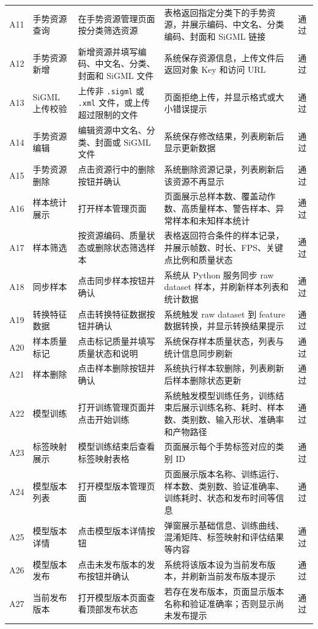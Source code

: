 \begin{longtable}{L{0.08\textwidth} L{0.18\textwidth} L{0.24\textwidth} L{0.28\textwidth} L{0.12\textwidth}}
  A11 & 手势资源查询 & 在手势资源管理页面按分类筛选资源 & 表格返回指定分类下的手势资源，并展示编码、中文名、分类编码、封面和 SiGML 链接 & 通过 \\
  A12 & 手势资源新增 & 新增资源并填写编码、中文名、分类、封面和 SiGML 文件 & 系统保存资源信息，上传文件后返回对象 Key 和访问 URL & 通过 \\
  A13 & SiGML 上传校验 & 上传非 \texttt{.sigml} 或 \texttt{.xml} 文件，或上传超过限制的文件 & 页面拒绝上传，并显示格式或大小错误提示 & 通过 \\
  A14 & 手势资源编辑 & 编辑资源中文名、分类、封面或 SiGML 文件 & 系统保存修改结果，列表刷新后显示更新数据 & 通过 \\
  A15 & 手势资源删除 & 点击资源行中的删除按钮并确认 & 系统删除资源记录，列表刷新后该资源不再显示 & 通过 \\
  A16 & 样本统计展示 & 打开样本管理页面 & 页面展示总样本数、覆盖动作数、高质量样本、警告样本、异常样本和未知样本统计 & 通过 \\
  A17 & 样本筛选 & 按资源编码、质量状态或删除状态筛选样本 & 表格返回符合条件的样本记录，并展示帧数、时长、FPS、关键点比例和质量状态 & 通过 \\
  A18 & 同步样本 & 点击同步样本按钮并确认 & 系统从 Python 服务同步 raw dataset 样本，并刷新样本列表和统计数据 & 通过 \\
  A19 & 转换特征数据 & 点击转换特征数据按钮并确认 & 系统触发 raw dataset 到 feature 数据转换，并显示转换结果提示 & 通过 \\
  A20 & 样本质量标记 & 点击标记质量并填写质量状态和说明 & 系统保存样本质量状态，列表与统计信息同步刷新 & 通过 \\
  A21 & 样本删除 & 点击样本删除按钮并确认 & 系统执行样本软删除，列表刷新后样本删除状态更新 & 通过 \\
  A22 & 模型训练 & 打开训练管理页面并点击开始训练 & 系统触发模型训练任务，训练结束后展示训练名称、耗时、样本数、类别数、输入形状、准确率和产物路径 & 通过 \\
  A23 & 标签映射展示 & 模型训练结束后查看标签映射表格 & 页面展示每个手势标签对应的类别 ID & 通过 \\
  A24 & 模型版本列表 & 打开模型版本管理页面 & 页面展示版本名称、训练运行、样本数、类别数、验证准确率、训练耗时、状态和发布时间等信息 & 通过 \\
  A25 & 模型版本详情 & 点击模型版本详情按钮 & 弹窗展示基础信息、训练曲线、混淆矩阵、标签映射和评估结果等内容 & 通过 \\
  A26 & 模型版本发布 & 点击未发布版本的发布按钮并确认 & 系统将该版本设为当前发布版本，并刷新当前发布版本提示 & 通过 \\
  A27 & 当前发布版本 & 打开模型版本页面查看顶部发布状态 & 若存在发布版本，页面显示版本名称和验证准确率；否则显示尚未发布提示 & 通过 \\
  \bottomrule
\end{longtable}

